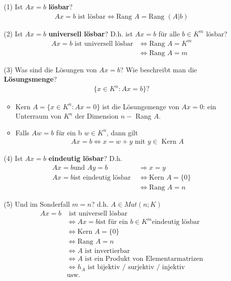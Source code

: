 \documentclass[11pt]{report}
\newcommand*\f[1] {\textbf{#1}}
\begin{document}
\begin{itemize}
\item[(1)] Ist $Ax = b$ \f{lösbar}?
\begin{align}
Ax = b \text{ ist lösbar} \Leftrightarrow \text{Rang } A = \text{Rang } (A|b)
\end{align}
\item[(2)] Ist $Ax = b$ \f{universell lösbar}? D.h. ist $Ax = b$ für alle $b \in K^m$ lösbar?
\begin{align}
Ax = b \text{ ist universell lösbar} &\Leftrightarrow \text{Rang } A = K^m \\
&\Leftrightarrow \text{Rang } A = m
\end{align}
\item[(3)] Was sind die Lösungen von $Ax = b$? Wie beschreibt man die \f{Lösungsmenge}?
\begin{align}
\{x \in K^n : Ax=b\}?
\end{align}
\begin{itemize}
 \item Kern $A = \{x \in K^n : Ax = 0 \}$ ist die Lösungsmenge von $Ax = 0$: ein Unterraum von $K^n$ der Dimension $n - $ Rang $A$.
 \item Falls $Aw = b$ für ein b $w \in K^n$, dann gilt
\begin{align}
Ax = b \Leftrightarrow x = w+y \text{ mit } y \in \text{ Kern } A
\end{align}
\end{itemize}
\item[(4)] Ist $Ax = b$ \f{eindeutig lösbar}? D.h.
\begin{align}
Ax = b \text{und } Ay = b &\Rightarrow x=y \\
Ax = b \text{ist eindeutig lösbar } &\Leftrightarrow \text{Kern } A = \{0\} \\
&\Leftrightarrow \text{Rang } A = n
\end{align}
\item[(5)] Und im Sonderfall $m=n$? d.h. $A \in Mat(n;K)$
\begin{align}
Ax=b &\text{ ist universell lösbar } \\
&\Leftrightarrow Ax = b \text{ist für ein } b \in K^m \text{eindeutig lösbar}\\
&\Leftrightarrow \text{Kern } A = \{0\}\\
&\Leftrightarrow \text{Rang } A = n\\
&\Leftrightarrow A \text{ ist invertierbar}\\
&\Leftrightarrow A \text{ ist ein Produkt von Elementarmatrizen}\\
&\Leftrightarrow h_A \text{ ist bijektiv / surjektiv / injektiv} \\
&\text{usw.}
\end{align}
\end{itemize}
\end{document}

